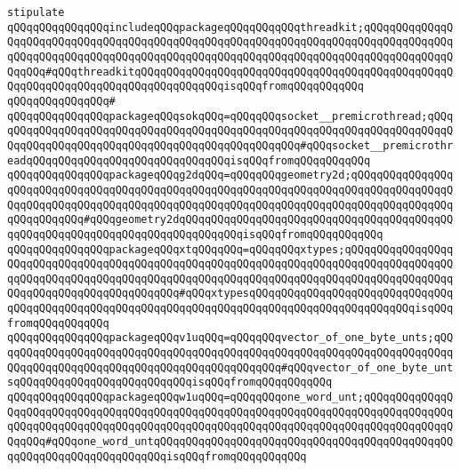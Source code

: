 \newline
\verb|stipulate|\newline
\verb|qQQqqQQqqQQqqQQqincludeqQQqpackageqQQqqQQqqQQqthreadkit;qQQqqQQqqQQqqQQqqQQqqQQqqQQqqQQqqQQqqQQqqQQqqQQqqQQqqQQqqQQqqQQqqQQqqQQqqQQqqQQqqQQqqQQqqQQqqQQqqQQqqQQqqQQqqQQqqQQqqQQqqQQqqQQqqQQqqQQqqQQqqQQqqQQqqQQqqQQqqQQq#qQQqthreadkitqQQqqQQqqQQqqQQqqQQqqQQqqQQqqQQqqQQqqQQqqQQqqQQqqQQqqQQqqQQqqQQqqQQqqQQqqQQqqQQqqQQqisqQQqfromqQQqqQQqqQQq|\newline
\verb|qQQqqQQqqQQqqQQq#|\newline
\verb|qQQqqQQqqQQqqQQqpackageqQQqsokqQQq=qQQqqQQqsocket__premicrothread;qQQqqQQqqQQqqQQqqQQqqQQqqQQqqQQqqQQqqQQqqQQqqQQqqQQqqQQqqQQqqQQqqQQqqQQqqQQqqQQqqQQqqQQqqQQqqQQqqQQqqQQqqQQqqQQqqQQqqQQq#qQQqsocket__premicrothreadqQQqqQQqqQQqqQQqqQQqqQQqqQQqqQQqisqQQqfromqQQqqQQqqQQq|\newline
\verb|qQQqqQQqqQQqqQQqpackageqQQqg2dqQQq=qQQqqQQqgeometry2d;qQQqqQQqqQQqqQQqqQQqqQQqqQQqqQQqqQQqqQQqqQQqqQQqqQQqqQQqqQQqqQQqqQQqqQQqqQQqqQQqqQQqqQQqqQQqqQQqqQQqqQQqqQQqqQQqqQQqqQQqqQQqqQQqqQQqqQQqqQQqqQQqqQQqqQQqqQQqqQQqqQQqqQQq#qQQqgeometry2dqQQqqQQqqQQqqQQqqQQqqQQqqQQqqQQqqQQqqQQqqQQqqQQqqQQqqQQqqQQqqQQqqQQqqQQqqQQqqQQqisqQQqfromqQQqqQQqqQQq|\newline
\verb|qQQqqQQqqQQqqQQqpackageqQQqxtqQQqqQQq=qQQqqQQqxtypes;qQQqqQQqqQQqqQQqqQQqqQQqqQQqqQQqqQQqqQQqqQQqqQQqqQQqqQQqqQQqqQQqqQQqqQQqqQQqqQQqqQQqqQQqqQQqqQQqqQQqqQQqqQQqqQQqqQQqqQQqqQQqqQQqqQQqqQQqqQQqqQQqqQQqqQQqqQQqqQQqqQQqqQQqqQQqqQQqqQQqqQQq#qQQqxtypesqQQqqQQqqQQqqQQqqQQqqQQqqQQqqQQqqQQqqQQqqQQqqQQqqQQqqQQqqQQqqQQqqQQqqQQqqQQqqQQqqQQqqQQqqQQqqQQqisqQQqfromqQQqqQQqqQQq|\newline
\verb|qQQqqQQqqQQqqQQqpackageqQQqv1uqQQq=qQQqqQQqvector_of_one_byte_unts;qQQqqQQqqQQqqQQqqQQqqQQqqQQqqQQqqQQqqQQqqQQqqQQqqQQqqQQqqQQqqQQqqQQqqQQqqQQqqQQqqQQqqQQqqQQqqQQqqQQqqQQqqQQqqQQqqQQq#qQQqvector_of_one_byte_untsqQQqqQQqqQQqqQQqqQQqqQQqqQQqisqQQqfromqQQqqQQqqQQq|\newline
\verb|qQQqqQQqqQQqqQQqpackageqQQqw1uqQQq=qQQqqQQqone_word_unt;qQQqqQQqqQQqqQQqqQQqqQQqqQQqqQQqqQQqqQQqqQQqqQQqqQQqqQQqqQQqqQQqqQQqqQQqqQQqqQQqqQQqqQQqqQQqqQQqqQQqqQQqqQQqqQQqqQQqqQQqqQQqqQQqqQQqqQQqqQQqqQQqqQQqqQQqqQQqqQQq#qQQqone_word_untqQQqqQQqqQQqqQQqqQQqqQQqqQQqqQQqqQQqqQQqqQQqqQQqqQQqqQQqqQQqqQQqqQQqqQQqisqQQqfromqQQqqQQqqQQq|\newline
